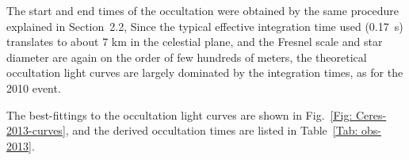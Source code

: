 \documentclass[useAMS,usenatbib]{mn2e}
\begin{document}
The start and end times of the occultation were obtained by the same procedure explained in Section~2.2, %
Since the typical effective integration time used (0.17~s) translates to about 7 km in the celestial plane, and the Fresnel scale and star diameter are again on the order of few hundreds of meters, the theoretical occultation light curves are largely dominated by the integration times, as for the 2010 event.

The best-fittings to the occultation light curves are shown in Fig.~\ref{Fig: Ceres-2013-curves}, and the derived occultation times are listed in Table~\ref{Tab: obs-2013}.
\end{document}
